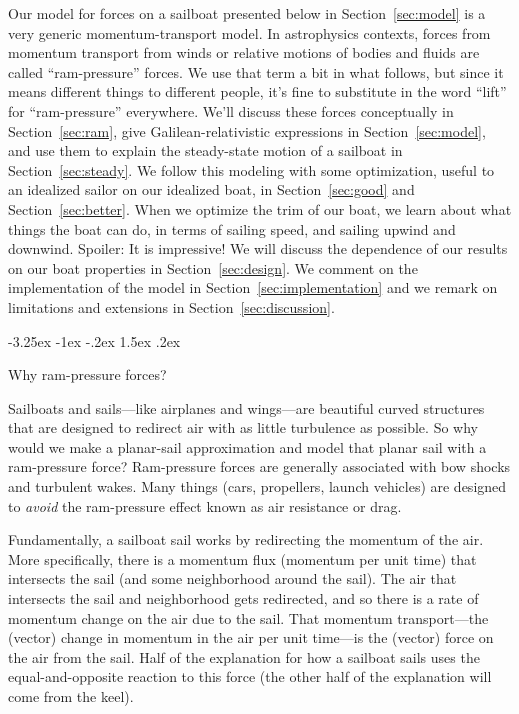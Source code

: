 \documentclass[letterpaper]{article}
\makeatletter
\newcommand{\secref}[1]{Section~\ref{#1}}
\renewcommand\section{\@startsection {section}{1}{\z@}%
  {-3.25ex \@plus -1ex \@minus -.2ex}%
  {1.5ex \@plus .2ex}%
  {\raggedright\normalfont\large\bfseries}}
\makeatother
\begin{document}
Our model for forces on a sailboat presented below in \secref{sec:model} is a very generic momentum-transport model.
In astrophysics contexts, forces from momentum transport from winds or relative motions of bodies and fluids are called ``ram-pressure'' forces.
We use that term a bit in what follows, but since it means different things to different people, it's fine to substitute in the word ``lift'' for ``ram-pressure'' everywhere.
We'll discuss these forces conceptually in \secref{sec:ram}, give Galilean-relativistic expressions in \secref{sec:model}, and use them to explain the steady-state motion of a sailboat in \secref{sec:steady}.
We follow this modeling with some optimization, useful to an idealized sailor on our idealized boat, in \secref{sec:good} and \secref{sec:better}.
When we optimize the trim of our boat, we learn about what things the boat can do, in terms of sailing speed, and sailing upwind and downwind.
Spoiler: It is impressive!
We will discuss the dependence of our results on our boat properties in \secref{sec:design}.
We comment on the implementation of the model in \secref{sec:implementation} and we remark on limitations and extensions in \secref{sec:discussion}.

\section{Why ram-pressure forces?}\label{sec:ram}

Sailboats and sails---like airplanes and wings---are beautiful curved structures that are designed to redirect air with as little turbulence as possible.
So why would we make a planar-sail approximation and model that planar sail with a ram-pressure force?
Ram-pressure forces are generally associated with bow shocks and turbulent wakes.
Many things (cars, propellers, launch vehicles) are designed to \emph{avoid} the ram-pressure effect known as air resistance or drag.

Fundamentally, a sailboat sail works by redirecting the momentum of the air.
More specifically, there is a momentum flux (momentum per unit time) that intersects the sail (and some neighborhood around the sail).
The air that intersects the sail and neighborhood gets redirected, and so there is  a rate of momentum change on the air due to the sail.
That momentum transport---the (vector) change in momentum in the air per unit time---is the (vector) force on the air from the sail.
Half of the explanation for how a sailboat sails uses the equal-and-opposite reaction to this force (the other half of the explanation will come from the keel).
\end{document}

